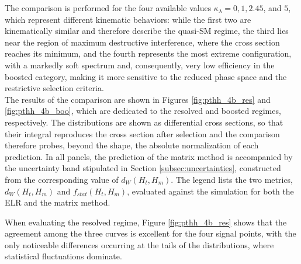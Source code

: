 The comparison is performed for the four available values $\kappa_\lambda = 0, 1, 2.45$, and $5$, which represent different kinematic behaviors: while the first two are kinematically similar and therefore describe the quasi-SM regime, the third lies near the region of maximum destructive interference, where the cross section reaches its minimum, and the fourth represents the most extreme configuration, with a markedly soft spectrum and, consequently, very low efficiency in the boosted category, making it more sensitive to the reduced phase space and the restrictive selection criteria.\\

The results of the comparison are shown in Figures \ref{fig:pthh_4b_res} and \ref{fig:pthh_4b_boo}, which are dedicated to the resolved and boosted regimes, respectively. The distributions are shown as differential cross sections, so that their integral reproduces the cross section after selection and the comparison therefore probes, beyond the shape, the absolute normalization of each prediction. In all panels, the prediction of the matrix method is accompanied by the uncertainty band stipulated in Section \ref{subsec:uncertainties}, constructed from the corresponding value of $d_W(H_{t},H_{m})$. The legend lists the two metrics, $d_W(H_{t},H_{m})$ and $f_{stat}(H_{t},H_{m})$, evaluated against the simulation for both the ELR and the matrix method.

When evaluating the resolved regime, Figure \ref{fig:pthh_4b_res} shows that the agreement among the three curves is excellent for the four signal points, with the only noticeable differences occurring at the tails of the distributions, where statistical fluctuations dominate.


